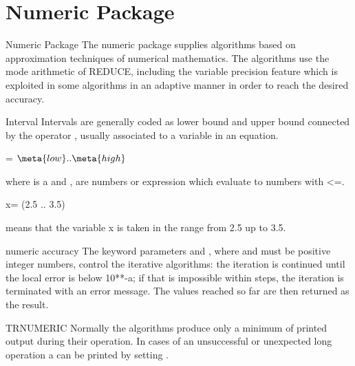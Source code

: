 \section{Numeric Package}
\begin{Introduction}{Numeric Package}
The numeric package supplies algorithms based on approximation
techniques of numerical mathematics. The algorithms use
the  mode arithmetic of REDUCE, including
the variable precision feature which is exploited in some
algorithms in an adaptive manner in order to reach the
desired accuracy.
\end{Introduction}

\begin{Type}{Interval} 
Intervals are generally coded as lower bound and
upper bound connected by the operator , usually 
associated to a variable in an 
equation. 

\begin{Syntax}
   = \(\meta{low} .. \meta{high}\)
\end{Syntax}

where  is a  and ,  are
numbers or expression which evaluate to numbers with <=.

\begin{Examples}
     x= (2.5 .. 3.5) 
\end{Examples}

means that the variable x is taken in the range from 2.5 up to
3.5. 


\end{Type}

\begin{Concept}{numeric accuracy} 
The keyword parameters  and , 
where and  must be positive integer numbers, control the
iterative algorithms: the iteration is continued until
the local error is below 10**{-a}; if that is impossible
within  steps, the iteration is terminated with an
error message. The values reached so far are then returned
as the result.
\end{Concept}

\begin{Switch}{TRNUMERIC}
Normally the algorithms produce only a minimum of printed
output during their operation. In cases of an unsuccessful 
or unexpected long operation a  can be
printed by setting  .
\end{Switch}

